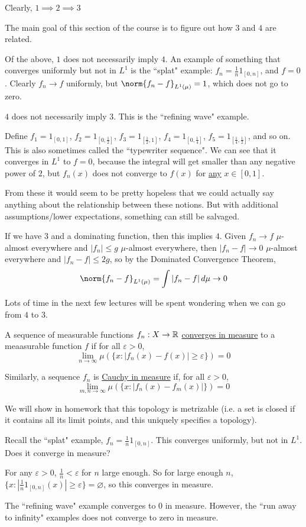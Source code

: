 \documentclass[x11names,reqno,14pt]{extarticle}
\newcommand*{\oo}{\infty}
\begin{document}
Clearly, $1\implies2\implies3$

The main goal of this section of the course is to figure out how $3$ and $4$ are related. 

\exm

Of the above, $1$ does not necessarily imply $4$. An example of something that converges uniformly but not in $L^1$ is the ``splat" example: $f_n = \frac{1}{n}1_[0, n]$, and $f = 0$. Clearly $f_n \to f$ uniformly, but $\norm{f_n - f}_{L^1(\mu)} = 1$, which does not go to zero. 

\exm

$4$ does not necessarily imply $3$. This is the ``refining wave" example. 

Define $f_1 = 1_{[0, 1]}$, $f_2 = 1_{[0, \frac{1}{2}]}$, $f_3 = 1_{[\frac{1}{2}, 1]}$, $f_4 = 1_{[0, \frac{1}{4}]}$, $f_5 = 1_{[\frac{1}{4}, \frac{1}{2}]}$, and so on. This is also sometimes called the ``typewriter sequence". We can see that it converges in $L^1$ to $f = 0$, because the integral will get smaller than any negative power of $2$, but $f_n(x)$ does not converge to $f(x)$ for \underline{any} $x \in [0, 1]$. 

From these it would seem to be pretty hopeless that we could actually say anything about the relationship between these notions. But with additional assumptions/lower expectations, something can still be salvaged. 

\exm

If we have $3$ and a dominating function, then this implies $4$. Given $f_n \to f$ $\mu$-almost everywhere and $|f_n| \leq g$ $\mu$-almost everywhere, then $|f_n - f| \to 0$ $\mu$-almost everywhere and $|f_n - f| \leq 2g$, so by the Dominated Convergence Theorem, 
\[
\norm{f_n - f}_{L^1(\mu)} = \int|f_n - f|\,d\mu \to 0
\]

Lots of time in the next few lectures will be spent wondering when we can go from $4$ to $3$. 


A sequence of measurable functions $f_n:X\to\mathbb{R}$ \underline{converges in measure} to a meaasurable function $f$ if for all $\varepsilon>0$, 
\[
\lim_{n\to\oo}\mu(\{x : |f_n(x) - f(x)| \geq \varepsilon\}) = 0
\]

Similarly, a sequence $f_n$ is \underline{Cauchy in measure} if, for all $\varepsilon>0$, 
\[
\lim_{m, n\to\oo}\mu(\{x : |f_n(x) - f_m(x)|\}) = 0
\]

\rem

We will show in homework that this topology is metrizable (i.e. a set is closed if it contains all its limit points, and this uniquely specifies a topology). 

\ex

Recall the ``splat" example, $f_n = \frac{1}{n}1_{[0, n]}$. This converges uniformly, but not in $L^1$. Does it converge in measure? 

For any $\varepsilon > 0$, $\frac{1}{n} < \varepsilon$ for $n$ large enough. So for large enough $n$, $\{x : |\frac{1}{n}1_{[0, n]}(x)| \geq \varepsilon\} = \varnothing$, so this converges in measure. 

The ``refining wave" example converges to 0 in measure. However, the ``run away to infinity" examples does not converge to zero in measure. 
\end{document}
